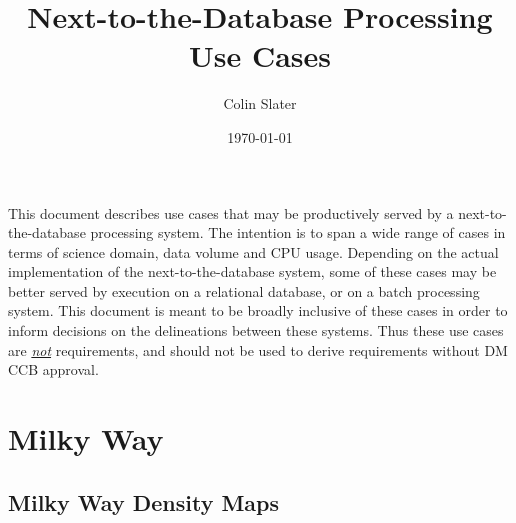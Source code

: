 \documentclass[DM,authoryear,toc]{lsstdoc}
\title{Next-to-the-Database Processing Use Cases}
\author{%
Colin Slater
}
\date{\today}
\begin{document}
\maketitle

This document describes use cases that may be productively served by a
next-to-the-database processing system. The intention is to span a wide range
of cases in terms of science domain, data volume and CPU usage. Depending on
the actual implementation of the next-to-the-database system, some of these
cases may be better served by execution on a relational database, or on a
batch processing system. This document is meant to be broadly inclusive of
these cases in order to inform decisions on the delineations between these
systems. Thus these use cases are \textit{\underline{not}} requirements, and
should not be used to derive requirements without DM CCB approval.

\section{Milky Way}

\subsection{Milky Way Density Maps}
\label{mw_density}
\end{document}
